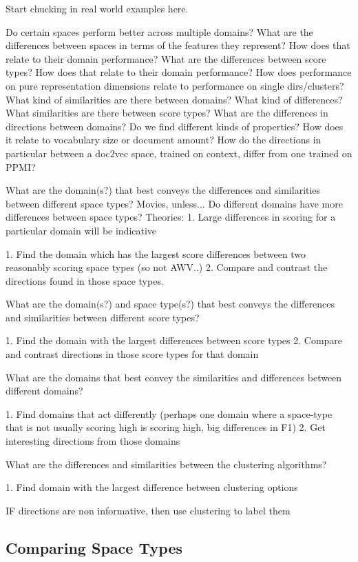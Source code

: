 Start chucking in real world examples here.

Do certain spaces perform better across multiple domains?
What are the differences between spaces in terms of the features they represent? How does that relate to their domain performance?
What are the differences between score types? How does that relate to their domain performance?
How does performance on pure representation dimensions relate to performance on single dirs/clusters?
What kind of similarities are there between domains? What kind of differences?
What similarities are there between score types?
What are the differences in directions between domains? Do we find different kinds of properties? How does it relate to vocabulary size or document amount?
How do the directions in particular between a doc2vec space, trained on context, differ from one trained on PPMI?


What are the domain(s?) that best conveys the differences and similarities between different space types?
	Movies, unless...
		Do different domains have more differences between space types? Theories:
			1. Large differences in scoring for a particular domain will be indicative
			
1. Find the domain which has the largest score differences between two reasonably scoring space types (so not AWV..)
2. Compare and contrast the directions found in those space types. 

What are the domain(s?) and space type(s?) that best conveys the differences and similarities between different score types?

1. Find the domain with the largest differences between score types
2. Compare and contrast directions in those score types for that domain

What are the domains that best convey the similarities and differences between different domains?

1. Find domains that act differently (perhaps one domain where a space-type that is not usually scoring high is scoring high, big differences in F1)
2. Get interesting directions from those domains

What are the differences and similarities between the clustering algorithms?

1. Find domain with the largest difference between clustering options

IF directions are non informative, then use clustering to label them

\subsection{Comparing Space Types}

